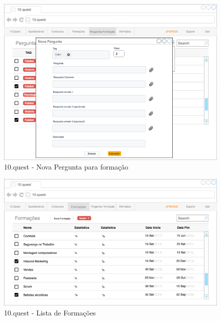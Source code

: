 \begin{figure}[ht!]
	\begin{center}
		\includegraphics[width=1\textwidth]{img/prototipos/7.png}
		\caption{10.quest - Nova Pergunta para formação}
		\label{10q-}
	\end{center}
\end{figure}

\begin{figure}[ht!]
	\begin{center}
		\includegraphics[width=1\textwidth]{img/prototipos/8.png}
		\caption{10.quest - Lista de Formações}
		\label{10q-}
	\end{center}
\end{figure}

